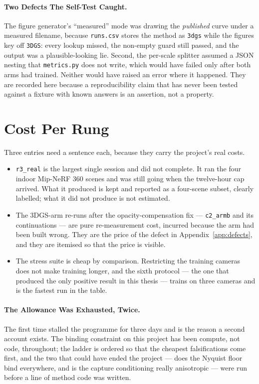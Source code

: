 \paragraph{Two Defects The Self-Test Caught.} The
figure generator's ``measured'' mode was drawing the \emph{published} curve under
a measured filename, because \texttt{runs.csv} stores the method as
\texttt{3dgs} while the figures key off \texttt{3DGS}: every lookup missed, the
non-empty guard still passed, and the output was a plausible-looking lie. Second,
the per-scale splitter assumed a JSON nesting that \texttt{metrics.py} does not
write, which would have failed only after both arms had trained. Neither would
have raised an error where it happened. They are recorded here because a
reproducibility claim that has never been tested against a fixture with known
answers is an assertion, not a property.

\section{Cost Per Rung}
\label{app:ladder}



Three entries need a sentence each, because they carry the project's real costs.

\begin{itemize}[leftmargin=1.4em,itemsep=3pt]
  \item \texttt{r3\_real} is the largest single session and did not complete. It
        ran the four indoor Mip-NeRF 360 scenes and was still going when the
        twelve-hour cap arrived. What it produced is kept and reported as a
        four-scene subset, clearly labelled; what it did not produce is not
        estimated.
  \item The 3DGS-arm re-runs after the opacity-compensation fix --- \texttt{c2\_armb} and its continuations
        --- are pure re-measurement cost, incurred because the arm had been built
        wrong. They are the price of the defect in Appendix~\ref{app:defects},
        and they are itemised so that the price is visible.
  \item The stress suite is cheap by comparison. Restricting the training cameras
        does not make training longer, and the sixth protocol --- the one that
        produced the only positive result in this thesis --- trains on three
        cameras and is the fastest run in the table.
\end{itemize}

\paragraph{The Allowance Was Exhausted, Twice.} The first time stalled the
programme for three days and is the reason a second account exists. The binding
constraint on this project has been compute, not code, throughout; the ladder is
ordered so that the cheapest falsifications come first, and the two that could
have ended the project --- does the Nyquist floor bind everywhere, and is the
capture conditioning really anisotropic --- were run before a line of method code
was written.
